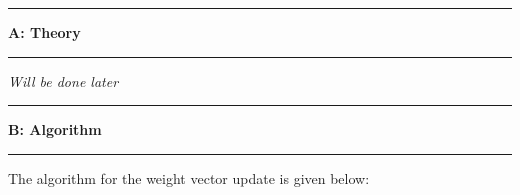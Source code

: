 \documentclass[11pt]{article}
\newcommand\question[2]{\vspace{.25in}\hrule\textbf{#1: #2}\vspace{.5em}\hrule\vspace{.10in}}
\begin{document}
\newcommand\NAME{Turash and Luiz}  %
\newcommand\ID{tmosharr \& lperesde}     %
\newcommand\HWNUM{}              %




\question{A}{Theory} 

\textit{Will be done later}

\question{B}{Algorithm} 

The algorithm for the weight vector update is given below:		
\end{document}
